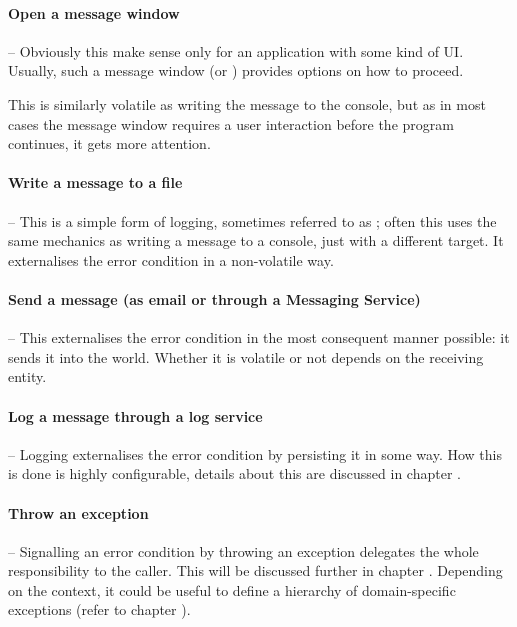 \paragraph{Open a message window}– Obviously this make sense only for an application with some kind of UI. Usually, such a message window (or ) provides options on how to proceed.

This is similarly volatile as writing the message to the console, but as in most cases the message window requires a user interaction before the program continues, it gets more attention.

\paragraph{Write a message to a file}– This is a simple form of logging, sometimes referred to as ; often this uses the same mechanics as writing a message to a console, just with a different target. It externalises the error condition in a non-volatile way.

\paragraph{Send a message (as email or through a Messaging Service)}– This externalises the error condition in the most consequent manner possible: it sends it into the world. Whether it is volatile or not depends on the receiving entity.

\paragraph{Log a message through a log service}– Logging externalises the error condition by persisting it in some way. How this is done is highly configurable, details about this are discussed in chapter .

\paragraph{Throw an exception}– Signalling an error condition by throwing an exception delegates the whole responsibility to the caller. This will be discussed further in chapter . Depending on the context, it could be useful to define a hierarchy of domain-specific exceptions (refer to chapter ).

